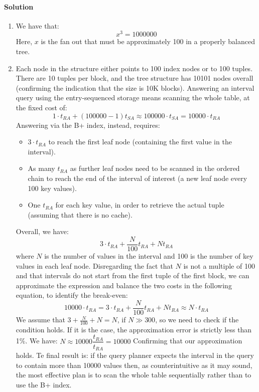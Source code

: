 \paragraph*{Solution}
\begin{enumerate}
    \item We have that: 
        \[x^3=1000000\]
        Here, $x$ is the fan out that must be approximately 100 in a properly balanced tree.
    \item Each node in the structure either points to 100 index nodes or to 100 tuples. 
        There are 10 tuples per block, and the tree structure has 10101 nodes overall (confirming the indication that the size is 10K blocks).
        Answering an interval query using the entry-sequenced storage means scanning the whole table, at the fixed cost of: 
        \[1\cdot t_{RA}+(100000-1)t_{SA} \approx 100000\cdot t_{SA}=10000\cdot t_{RA}\]
        Answering via the B+ index, instead, requires:
        \begin{itemize}
            \item $3\cdot t_{RA}$ to reach the first leaf node (containing the first value in the interval). 
            \item As many $t_{RA}$ as further leaf nodes need to be scanned in the ordered chain to reach the end of the interval of interest (a new leaf node every 100 key values). 
            \item One $t_{RA}$ for each key value, in order to retrieve the actual tuple (assuming that there is no cache). 
        \end{itemize}
        Overall, we have: 
        \[3 \cdot t_{RA}+\dfrac{N}{100}t_{RA}+Nt_{RA}\]
        where $N$ is the number of values in the interval and 100 is the number of key values in each leaf node.
        Disregarding the fact that $N$ is not a multiple of 100 and that intervals do not start from the first tuple of the first block, we can approximate the expression and balance the two costs in the following equation, to identify the break-even:
        \[10000\cdot t_{RA}=3 \cdot t_{RA}+\dfrac{N}{100}t_{RA}+Nt_{RA} \approx N \cdot t_{RA}\]
        We assume that $3+\frac{N}{100}+N = N$, if $N \gg 300$, so we need to check if the condition holds. 
        If it is the case, the approximation error is strictly less than 1\%. 
        We have: 
        $N \approx 10000 \dfrac{t_{RA}}{t_{RA}}= 10000$
        Confirming that our approximation holds. 
        Te final result is: if the query planner expects the interval in the query to contain more than 10000 values then, as counterintuitive as it may sound, the most effective plan is to scan the whole table sequentially rather than to use the B+ index.
\end{enumerate}